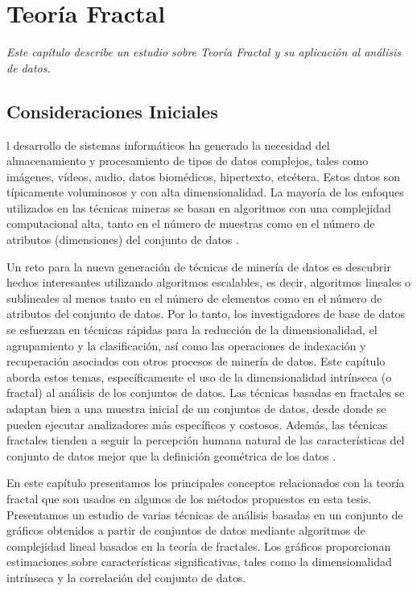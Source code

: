  
\let\textcircled=\pgftextcircled
\chapter{Teoría Fractal} {\textit{Este capítulo describe un estudio sobre Teoría Fractal y su aplicación   al análisis de datos. }}
\label{cap:teoria_fractal}


\section{Consideraciones Iniciales}


l desarrollo de sistemas informáticos ha generado la necesidad del almacenamiento y procesamiento de tipos de datos complejos, tales como imágenes, vídeos, audio, datos biomédicos, hipertexto, etcétera. Estos datos son típicamente  voluminosos y con alta dimensionalidad. La mayoría de los enfoques utilizados en las técnicas mineras se basan en algoritmos con una complejidad computacional alta, tanto en el número de muestras como en el número de atributos (dimensiones) del conjunto de datos \cite{DMFractalsBook}.

 Un reto para la nueva generación de técnicas de minería de datos es descubrir hechos interesantes utilizando algoritmos escalables, es decir, algoritmos lineales o sublineales al menos tanto en el número de elementos como en el número de atributos del conjunto de datos. Por lo tanto, los investigadores de  base de  datos se esfuerzan en técnicas rápidas para la reducción de la dimensionalidad, el agrupamiento y la clasificación, así como las operaciones de indexación y recuperación asociados con otros procesos de minería de datos. Este capítulo aborda estos temas, específicamente el uso de la dimensionalidad intrínseca (o fractal) al análisis de los conjuntos de datos. Las técnicas basadas en fractales se adaptan bien a una muestra inicial de un conjuntos de datos, desde donde se pueden ejecutar analizadores más específicos y costosos. Además, las técnicas fractales tienden a seguir la percepción humana natural de las características del conjunto de datos mejor que la definición geométrica de los datos \cite{journals/jidm/TrainaTF10}. 
 
  
 En este capítulo presentamos los principales conceptos relacionados con la teoría fractal que son usados en algunos de los métodos propuestos en esta tesis. Presentamos un estudio de varias técnicas de análisis basadas en un conjunto de gráficos obtenidos a partir de conjuntos de datos mediante algoritmos de complejidad lineal basados en la teoría de fractales. Los gráficos proporcionan estimaciones sobre características significativas, tales como la dimensionalidad intrínseca   y la correlación  del conjunto de datos.  
 
